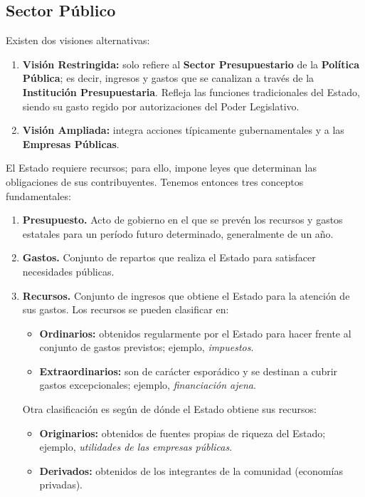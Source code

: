 \documentclass[10pt,a4paper]{article}
\begin{document}
\subsection{Sector Público}

Existen dos visiones alternativas:
\begin{enumerate}
\item \textbf{Visión Restringida:} solo refiere al \textbf{Sector Presupuestario} de la \textbf{Política Pública}; es decir, ingresos y gastos que se canalizan a través de la \textbf{Institución Presupuestaria}. Refleja las funciones tradicionales del Estado, siendo su gasto regido por autorizaciones del Poder Legislativo.
\item \textbf{Visión Ampliada:} integra acciones típicamente gubernamentales y a las \textbf{Empresas Públicas}.
\end{enumerate}

El Estado requiere recursos; para ello, impone leyes que determinan las obligaciones de sus contribuyentes. Tenemos entonces tres conceptos fundamentales:

\begin{enumerate}
\item \textbf{Presupuesto.} Acto de gobierno en el que se prevén los recursos y gastos estatales para un período futuro determinado, generalmente de un año.
\item \textbf{Gastos.} Conjunto de repartos que realiza el Estado para satisfacer necesidades públicas.
\item \textbf{Recursos.} Conjunto de ingresos que obtiene el Estado para la atención de sus gastos. Los recursos se pueden clasificar en:
\begin{itemize}
\item \textbf{Ordinarios:} obtenidos regularmente por el Estado para hacer frente al conjunto de gastos previstos; ejemplo, \textit{impuestos}.
\item \textbf{Extraordinarios:} son de carácter esporádico y se destinan a cubrir gastos excepcionales; ejemplo, \textit{financiación ajena}.
\end{itemize}
Otra clasificación es según de dónde el Estado obtiene sus recursos:
\begin{itemize}
\item \textbf{Originarios:} obtenidos de fuentes propias de riqueza del Estado; ejemplo, \textit{utilidades de las empresas públicas}.
\item \textbf{Derivados:} obtenidos de los integrantes de la comunidad (economías privadas).
\end{itemize}
\end{enumerate}
\end{document}
